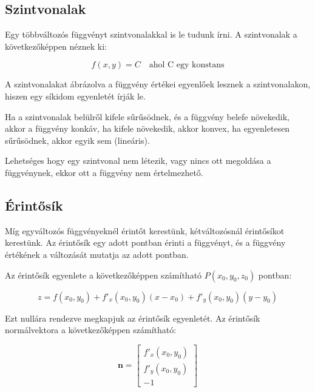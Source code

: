 \documentclass{article}
\begin{document}
\subsection{Szintvonalak}

Egy többváltozós függvényt szintvonalakkal is le tudunk írni. A szintvonalak a következőképpen néznek ki:

\begin{equation*}
    f(x, y) = C \quad \text{ahol C egy konstans}
\end{equation*}

A szintvonalakat ábrázolva a függvény értékei egyenlőek lesznek a szintvonalakon, hiszen egy síkidom egyenletét írják le.

Ha a szintvonalak belülről kifele sűrűsödnek, és a függvény belefe növekedik, akkor a függvény konkáv, 
ha kifele növekedik, akkor konvex, ha egyenletesen sűrűsödnek, akkor egyik sem (lineáris).

\vspace{4mm}

Lehetséges hogy egy szintvonal nem létezik, vagy nincs ott megoldása a függvénynek, ekkor ott a függvény nem értelmezhető.

\subsection{Érintősík}

Míg egyváltozós függvényeknél érintőt kerestünk, kétváltozósnál érintősíkot kerestünk. Az érintősík egy adott pontban érinti a függvényt, és a függvény értékének a változását mutatja az adott pontban.

\vspace{4mm}

Az érintősík egyenlete a következőképpen számítható $P(x_0,y_0,z_0)$ pontban:

\begin{equation*}
    z = f(x_0, y_0) + f'_x(x_0, y_0)(x - x_0) + f'_y(x_0, y_0)(y - y_0)
\end{equation*} 

Ezt nullára rendezve megkapjuk az é\-rin\-tő\-sík e\-gyen\-let\-ét. Az é\-rin\-tő\-sík nor\-mál\-vek\-to\-ra a kö\-vet\-ke\-ző\-kép\-pen számítható:

\begin{equation*}
    \mathbf{n} = \begin{bmatrix} f'_x(x_0, y_0) \\ f'_y(x_0, y_0) \\ -1 \end{bmatrix}
\end{equation*}
\end{document}
